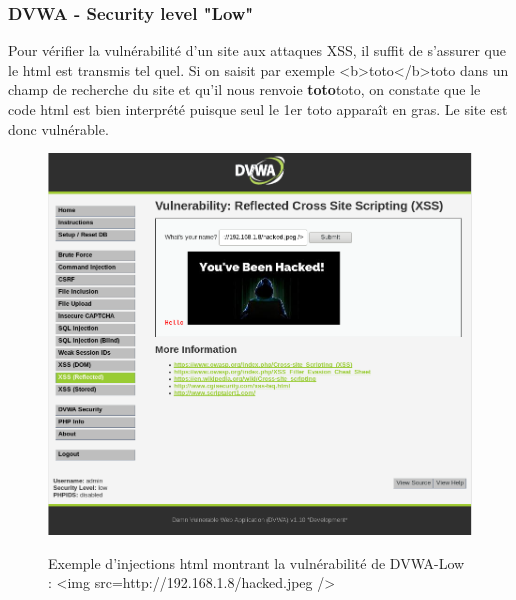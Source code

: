 \subsubsection{DVWA - Security level "Low"}

Pour vérifier la vulnérabilité d'un site aux attaques XSS, il suffit de s'assurer que le html est transmis tel quel. Si on saisit par exemple <b>toto</b>toto dans un champ de recherche du site et qu'il nous renvoie \textbf{toto}toto, on constate que le code html est bien interprété puisque seul le 1er toto apparaît en gras.  Le site est donc vulnérable. 



\begin{figure}[H]
	\begin{center}
		\label{}
		\includegraphics[scale=\scaledvwa]{images/xss/hack1.png}
		\caption{Exemple d'injections html montrant la vulnérabilité de DVWA-Low : <img src=http://192.168.1.8/hacked.jpeg />} 
	\end{center}
\end{figure}

